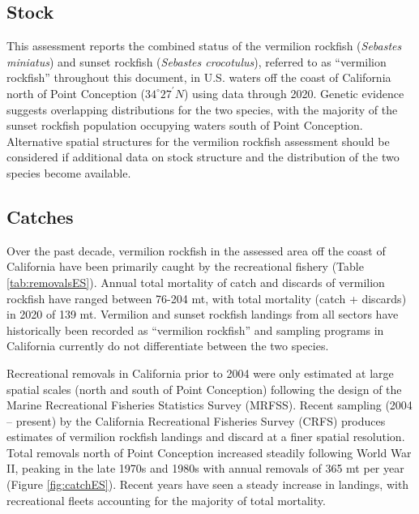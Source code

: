 \documentclass[11pt,
  english,
]{article}
\begin{document}
\leavevmode\tagmcend\tagstructend


\hypertarget{stock}{%
\subsection*{Stock}\label{stock}}

\leavevmode\tagmcend\tagstructend

This assessment reports the combined status of the vermilion rockfish (\emph{Sebastes miniatus}) and sunset rockfish (\emph{Sebastes crocotulus}), referred to as ``vermilion rockfish'' throughout this document, in U.S. waters off the coast of California north of Point Conception ($34^\circ 27^\prime N$) using data through 2020. Genetic evidence suggests overlapping distributions for the two species, with the majority of the sunset rockfish population occupying waters south of Point Conception. Alternative spatial structures for the vermilion rockfish assessment should be considered if additional data on stock structure and the distribution of the two species become available.


\hypertarget{catches}{%
\subsection*{Catches}\label{catches}}

\leavevmode\tagmcend\tagstructend

Over the past decade, vermilion rockfish in the assessed area off the coast of California have been primarily caught by the recreational fishery (Table \ref{tab:removalsES}). Annual total mortality of catch and discards of vermilion rockfish have ranged between 76-204 mt, with total mortality (catch + discards) in 2020 of 139 mt. Vermilion and sunset rockfish landings from all sectors have historically been recorded as ``vermilion rockfish'' and sampling programs in California currently do not differentiate between the two species.

Recreational removals in California prior to 2004 were only estimated at large spatial scales (north and south of Point Conception) following the design of the Marine Recreational Fisheries Statistics Survey (MRFSS). Recent sampling (2004 -- present) by the California Recreational Fisheries Survey (CRFS) produces estimates of vermilion rockfish landings and discard at a finer spatial resolution. Total removals north of Point Conception increased steadily following World War II, peaking in the late 1970s and 1980s with annual removals of 365 mt per year (Figure \ref{fig:catchES}). Recent years have seen a steady increase in landings, with recreational fleets accounting for the majority of total mortality.
\end{document}
